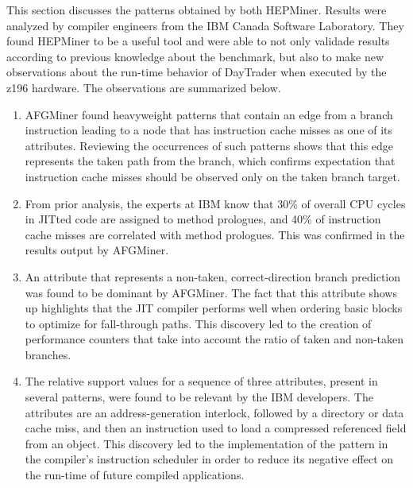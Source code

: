 This section discusses the patterns obtained by both HEPMiner. Results were analyzed by compiler engineers from the IBM Canada Software Laboratory. They found HEPMiner to be a useful tool and were able to not only validade results according to previous knowledge about the benchmark, but also to make new observations about the run-time behavior of DayTrader when executed by the z196 hardware. The observations are summarized below.
\begin{enumerate}
\item AFGMiner found heavyweight patterns that contain an edge from a branch instruction leading to a node that has instruction cache misses as one of its attributes. Reviewing the occurrences of such patterns shows that this edge represents the taken path from the branch, which confirms expectation that instruction cache misses should be observed only on the taken branch target.
\item From prior analysis, the experts at IBM know that 30\% of overall CPU cycles in JITted code are assigned to method prologues, and 40\% of instruction cache misses are correlated with method prologues. This was confirmed in the results output by AFGMiner.
\item An attribute that represents a non-taken, correct-direction branch prediction was found to be dominant by AFGMiner. The fact that this attribute shows up highlights that the JIT compiler performs well when ordering basic blocks to optimize for fall-through paths. This discovery led to the creation of performance counters that take into account the ratio of taken and non-taken branches.
\item The relative support values for a sequence of three attributes, present in several patterns, were found to be relevant by the IBM developers. The attributes are an address-generation interlock, followed by a directory or data cache miss, and then an instruction used to load a compressed referenced field from an object. This discovery led to the implementation of the pattern in the compiler's instruction scheduler in order to reduce its negative effect on the run-time of future compiled applications.
\end{enumerate}